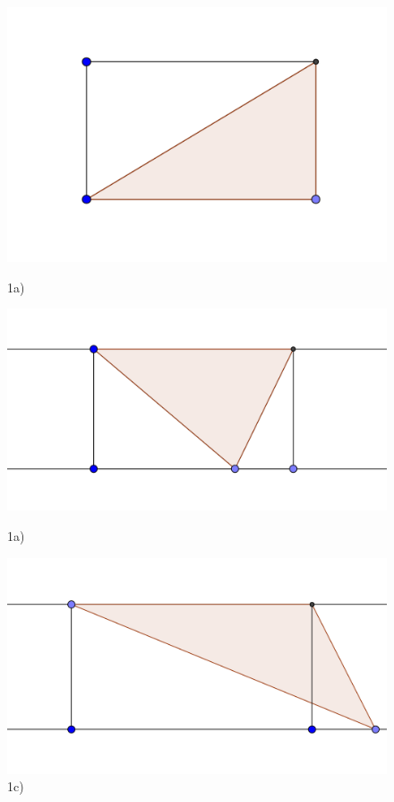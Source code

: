\begin{figure}[!h]
\includegraphics[width=1.2\linewidth]{0a}
\caption{1a)}
\endminipage\hfill
{}
\includegraphics[width=1.2\linewidth]{0c}
\caption{1a)}
\endminipage\hfill
{}
\includegraphics[width=1.2\linewidth]{0b}
\caption{1c)}
\endminipage
\end{figure}

